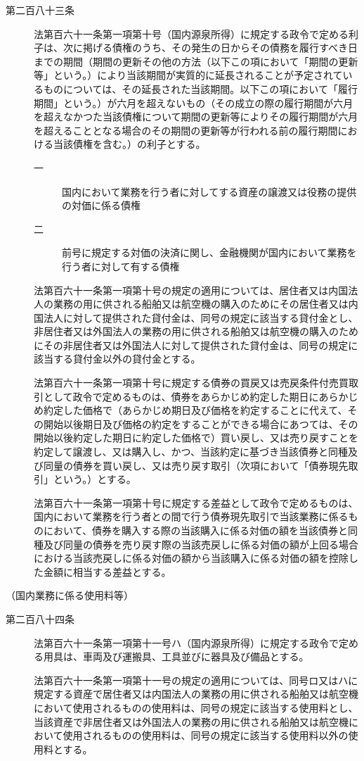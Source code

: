 \documentclass[twocolumn,a4j,10pt]{ltjtarticle}
\begin{document}
\begin{description}
\item[第二百八十三条]法第百六十一条第一項第十号（国内源泉所得）に規定する政令で定める利子は、次に掲げる債権のうち、その発生の日からその債務を履行すべき日までの期間（期間の更新その他の方法（以下この項において「期間の更新等」という。）により当該期間が実質的に延長されることが予定されているものについては、その延長された当該期間。以下この項において「履行期間」という。）が六月を超えないもの（その成立の際の履行期間が六月を超えなかつた当該債権について期間の更新等によりその履行期間が六月を超えることとなる場合のその期間の更新等が行われる前の履行期間における当該債権を含む。）の利子とする。
\begin{description}
\item[一]国内において業務を行う者に対してする資産の譲渡又は役務の提供の対価に係る債権
\item[二]前号に規定する対価の決済に関し、金融機関が国内において業務を行う者に対して有する債権
\end{description}
\item[]法第百六十一条第一項第十号の規定の適用については、居住者又は内国法人の業務の用に供される船舶又は航空機の購入のためにその居住者又は内国法人に対して提供された貸付金は、同号の規定に該当する貸付金とし、非居住者又は外国法人の業務の用に供される船舶又は航空機の購入のためにその非居住者又は外国法人に対して提供された貸付金は、同号の規定に該当する貸付金以外の貸付金とする。
\item[]法第百六十一条第一項第十号に規定する債券の買戻又は売戻条件付売買取引として政令で定めるものは、債券をあらかじめ約定した期日にあらかじめ約定した価格で（あらかじめ期日及び価格を約定することに代えて、その開始以後期日及び価格の約定をすることができる場合にあつては、その開始以後約定した期日に約定した価格で）買い戻し、又は売り戻すことを約定して譲渡し、又は購入し、かつ、当該約定に基づき当該債券と同種及び同量の債券を買い戻し、又は売り戻す取引（次項において「債券現先取引」という。）とする。
\item[]法第百六十一条第一項第十号に規定する差益として政令で定めるものは、国内において業務を行う者との間で行う債券現先取引で当該業務に係るものにおいて、債券を購入する際の当該購入に係る対価の額を当該債券と同種及び同量の債券を売り戻す際の当該売戻しに係る対価の額が上回る場合における当該売戻しに係る対価の額から当該購入に係る対価の額を控除した金額に相当する差益とする。
\end{description}
\noindent\hspace{10pt}（国内業務に係る使用料等）
\begin{description}
\item[第二百八十四条]法第百六十一条第一項第十一号ハ（国内源泉所得）に規定する政令で定める用具は、車両及び運搬具、工具並びに器具及び備品とする。
\item[]法第百六十一条第一項第十一号の規定の適用については、同号ロ又はハに規定する資産で居住者又は内国法人の業務の用に供される船舶又は航空機において使用されるものの使用料は、同号の規定に該当する使用料とし、当該資産で非居住者又は外国法人の業務の用に供される船舶又は航空機において使用されるものの使用料は、同号の規定に該当する使用料以外の使用料とする。
\end{description}
\end{document}
